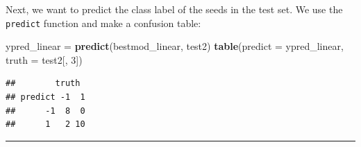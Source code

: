 \documentclass[]{article}
\newenvironment{Shaded}{\begin{snugshade}}{\end{snugshade}}
\newcommand{\DataTypeTok}[1]{\textcolor[rgb]{0.13,0.29,0.53}{#1}}
\newcommand{\DecValTok}[1]{\textcolor[rgb]{0.00,0.00,0.81}{#1}}
\newcommand{\KeywordTok}[1]{\textcolor[rgb]{0.13,0.29,0.53}{\textbf{#1}}}
\newcommand{\NormalTok}[1]{#1}
\newcommand{\StringTok}[1]{\textcolor[rgb]{0.31,0.60,0.02}{#1}}
\begin{document}
Next, we want to predict the class label of the seeds in the test set.
We use the \texttt{predict} function and make a confusion table:

\begin{Shaded}
\begin{Highlighting}[]
\NormalTok{ypred_linear =}\StringTok{ }\KeywordTok{predict}\NormalTok{(bestmod_linear, test2)}
\KeywordTok{table}\NormalTok{(}\DataTypeTok{predict =}\NormalTok{ ypred_linear, }\DataTypeTok{truth =}\NormalTok{ test2[, }\DecValTok{3}\NormalTok{])}
\end{Highlighting}
\end{Shaded}

\begin{verbatim}
##        truth
## predict -1  1
##      -1  8  0
##      1   2 10
\end{verbatim}

\begin{center}\rule{0.5\linewidth}{\linethickness}\end{center}

\footnotesize
\end{document}
